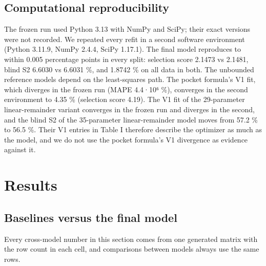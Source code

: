 \documentclass[aps,pra,preprint,notitlepage,superscriptaddress,amsmath,amssymb]{revtex4-2}
\begin{document}
\subsection{Computational reproducibility}

The frozen run used Python 3.13 with NumPy and SciPy; their exact versions were not recorded. We repeated every refit in a second software environment (Python 3.11.9, NumPy 2.4.4, SciPy 1.17.1). The final model reproduces to within 0.005 percentage points in every split: selection score 2.1473 vs 2.1481, blind S2 6.6030 vs 6.6031 \%, and 1.8742 \% on all data in both. The unbounded reference models depend on the least-squares path. The pocket formula's V1 fit, which diverges in the frozen run (MAPE 4.4·10⁶ \%), converges in the second environment to 4.35 \% (selection score 4.19). The V1 fit of the 29-parameter linear-remainder variant converges in the frozen run and diverges in the second, and the blind S2 of the 35-parameter linear-remainder model moves from 57.2 \% to 56.5 \%. Their V1 entries in Table I therefore describe the optimizer as much as the model, and we do not use the pocket formula's V1 divergence as evidence against it.


\section{Results}

\subsection{Baselines versus the final model}

Every cross-model number in this section comes from one generated matrix with the row count in each cell, and comparisons between models always use the same rows.
\end{document}
